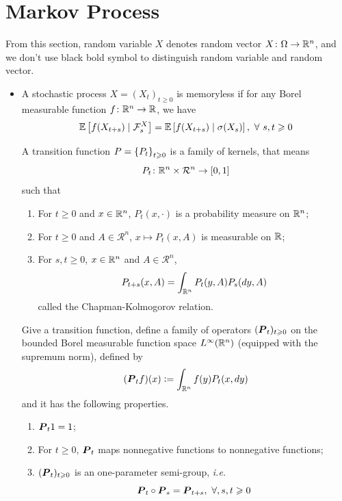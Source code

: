 \documentclass[a4paper,12pt]{article}
\begin{document}
\section{Markov Process}
From this section, random variable $X$ denotes random vector $X \colon \Omega \rightarrow \mathbb{R}^n$, and we don't use black bold symbol to distinguish random variable and random vector.
\begin{itemize}
  \item A stochastic process $X=(X_t)_{t \geqslant 0}$ is memoryless if for any Borel measurable function $f \colon \mathbb{R}^n \rightarrow \mathbb{R}$, we have
  \begin{equation*}
    \mathbb{E}\left[f(X_{t+s}) \mid \mathcal{F}^X_s\right] = \mathbb{E}\left[f(X_{t+s}) \mid \sigma(X_s)\right],~\forall~s,t \geqslant 0
  \end{equation*}

  \noindent A transition function $P = \left\{P_t\right\}_{t \geqslant 0}$ is a family of kernels, that means
  \begin{equation*}
    P_t \colon \mathbb{R}^n \times \mathcal{R}^n \rightarrow [0,1]
  \end{equation*}
  such that
  \begin{enumerate}[label=(\arabic*)]
    \item For $t \geqslant 0$ and $x \in \mathbb{R}^n$, $P_t(x,\cdot)$ is a probability measure on $\mathbb{R}^n$;
    \item For $t \geqslant 0$ and $A \in \mathcal{R}^n$, $x \mapsto P_t(x, A)$ is measurable on $\mathbb{R}$;
    \item For $s,t \geqslant 0$, $x \in \mathbb{R}^n$ and $A \in \mathcal{R}^n$,
    \begin{equation*}
      P_{t+s}(x,A) = \int_{\mathbb{R}^n}P_t(y,A)P_s(dy,A)
    \end{equation*}
    called the Chapman-Kolmogorov relation.
  \end{enumerate}
  Give a transition function, define a family of operators $(\boldsymbol{P}_t)_{t \geqslant 0}$ on the bounded Borel measurable function space $L^{\infty}(\mathbb{R}^n)$ (equipped with the supremum norm), defined by
  \begin{equation*}
    (\boldsymbol{P}_tf)(x) \vcentcolon= \int_{\mathbb{R}^n}f(y)P_t(x,dy)
  \end{equation*}
  and it has the following properties.
  \begin{enumerate}[label=(\arabic*)]
    \item $\boldsymbol{P}_t1 = 1$;
    \item For $t \geqslant 0$, $\boldsymbol{P}_t$ maps nonnegative functions to nonnegative functions;
    \item $(\boldsymbol{P}_t)_{t \geqslant 0}$ is an one-parameter semi-group, \emph{i.e.}
    \begin{equation*}
      \boldsymbol{P}_t\circ\boldsymbol{P}_s = \boldsymbol{P}_{t+s},~\forall,s,t \geqslant 0
    \end{equation*}
  \end{enumerate}


\end{itemize}
\end{document}

